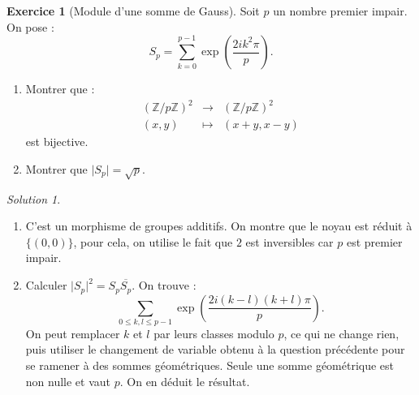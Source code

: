 \documentclass[french]{book}
\newcommand{\Z}{\mathbb{Z}}
\theoremstyle{definition}
\newtheorem{ex}{Exercice}[chapter]
\theoremstyle{remark}
\newtheorem*{sol}{Solution}
\begin{document}
\begin{ex}[Module d'une somme de Gauss]
	Soit $p$ un nombre premier impair. On pose :
	$$S_p=\sum_{k=0}^{p-1}\exp\left(\frac{2i k^2\pi}{p}\right).$$
	\begin{enumerate}
		\item Montrer que :
		$$\begin{array}{rcl}
			(\Z/p\Z)^2&\longrightarrow&(\Z/p\Z)^2\\
			(x,y)&\longmapsto&(x+y,x-y)
		\end{array}$$ est bijective.
		\item Montrer que $\lvert S_p\rvert=\sqrt{p}$.
	\end{enumerate}
\end{ex}
\begin{sol}
	\begin{enumerate}
		\item C'est un morphisme de groupes additifs. On montre que le noyau est réduit à $\{(0,0)\}$, pour cela, on utilise le fait que $2$ est inversibles car $p$ est premier impair.
		\item Calculer $\lvert S_p\rvert^2=S_p\overline{S_p}$. On trouve :
		$$\sum_{0\leqslant k,l\leqslant p-1}\exp\left(\frac{2i(k-l)(k+l)\pi}{p}\right).$$
		On peut remplacer $k$ et $l$ par leurs classes modulo $p$, ce qui ne change rien, puis utiliser le changement de variable obtenu à la question précédente pour se ramener à des sommes géométriques. Seule une somme géométrique est non nulle et vaut $p$. On en déduit le résultat.
	\end{enumerate}
\end{sol}
\end{document}
